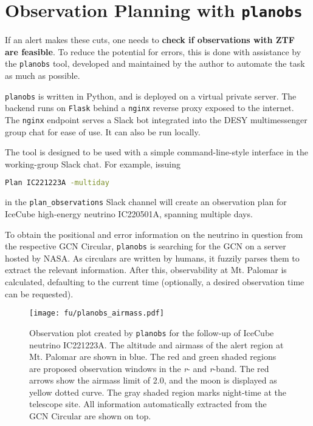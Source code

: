 \section{Observation Planning with \texttt{planobs}}\label{planobs}
If an alert makes these cuts, one needs to \textbf{check if observations with ZTF are feasible}. To reduce the potential for errors, this is done with assistance by the \texttt{planobs}  tool, developed and maintained by the author to automate the task as much as possible.

\texttt{planobs} is written in Python, and is deployed on a virtual private server. The backend runs on \texttt{Flask} behind a \texttt{nginx} reverse proxy exposed to the internet. The \texttt{nginx} endpoint serves a Slack bot integrated into the DESY multimessenger group chat for ease of use. It can also be run locally.

The tool is designed to be used with a simple command-line-style interface in the working-group Slack chat. For example, issuing
\begin{lstlisting}[language=bash,style=kaolstplain]
Plan IC221223A -multiday
\end{lstlisting}
in the \texttt{plan\_observations} Slack channel will create an observation plan for IceCube high-energy neutrino IC220501A, spanning multiple days.

To obtain the positional and error information on the neutrino in question from the respective GCN Circular, \texttt{planobs} is searching for the GCN on a server hosted by NASA. As circulars are written by humans, it fuzzily parses them to extract the relevant information. After this, observability at Mt. Palomar is calculated, defaulting to the current time (optionally, a desired observation time can be requested). 

\begin{figure}[h!]
    \texttt{[image: fu/planobs\_airmass.pdf]}
    \caption[Observation plan]{Observation plot created by \texttt{planobs} for the follow-up of IceCube neutrino IC221223A. The altitude and airmass of the alert region at Mt. Palomar are shown in blue. The red and green shaded regions are proposed observation windows in the \textit{r}- and \textit{r}-band. The red arrows show the airmass limit of 2.0, and the moon is displayed as yellow dotted curve. The gray shaded region marks night-time at the telescope site. All information automatically extracted from the GCN Circular are shown on top.}
\end{figure}

